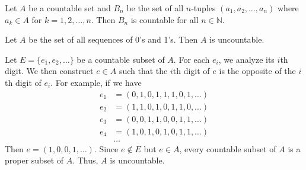 \documentclass[11pt,letterpaper]{jacky}
\newcommand{\nn}{\mathbb{N}}
\begin{document}
\begin{prop}
  Let $A$ be a countable set and $B_n$ be the set of all $n$-tuples
  $(a_1,a_2,\ldots,a_n)$ where $a_k\in A$ for $k=1,2,\ldots,n$. Then $B_n$ is
  countable for all $n\in\nn$.
\end{prop}

\begin{thm}
  Let $A$ be the set of all sequences of 0's and 1's. Then $A$ is uncountable.
\end{thm}

\begin{pf}
  Let $E=\{e_1,e_2,\ldots\}$ be a countable subset of $A$. For each $e_i$, we analyze its $i$th digit. We then construct $e\in A$ such that the $i$th digit of $e$ is the opposite of the $i$th digit of $e_i$. For example, if we have
  \begin{align*}
    e_1&=(\boxed{0},1,0,1,1,1,0,1,\ldots)\\
    e_2&=(1,\boxed{1},0,1,0,1,1,0,\ldots)\\
    e_3&=(0,0,\boxed{1},1,0,0,1,1,\ldots)\\
    e_4&=(1,0,1,\boxed{0},1,0,1,1,\ldots)\\
       &\ldots
  \end{align*}
  Then $e=(1,0,0,1,\ldots)$. Since $e\notin E$ but $e\in A$, every countable subset of $A$ is a proper subset of $A$. Thus, $A$ is uncountable.
\end{pf}
\end{document}

